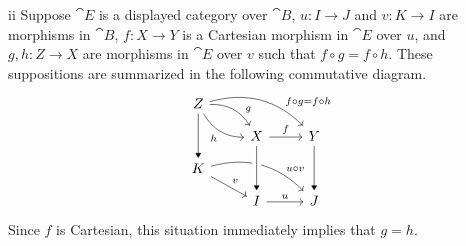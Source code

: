 \begin{partsolution}{ii}
Suppose \(\cat{E}\) is a displayed category over \(\cat{B}\), \(u : I \to J\) and \(v : K \to I\) are morphisms in \(\cat{B}\), \(f : X \to Y\) is a Cartesian morphism in \(\cat{E}\) over \(u\), and \(g, h : Z \to X\) are morphisms in \(\cat{E}\) over \(v\) such that \(f \circ g = f \circ h\).
These suppositions are summarized in the following commutative diagram.
\begin{equation*}
\begin{tikzcd}[row sep=small]
Z \arrow[rd, bend left, near end, "g"] \arrow[rd, bend right, "h"{below left}] \arrow[dd, -Triangle] \arrow[rrd, bend left, near end, "f \circ g = f \circ h"] \\
& X \arrow[dd, -Triangle] \arrow[r, "f"] & Y \arrow[dd, -Triangle] \\
K \arrow[rd, "v"] \arrow[rrd, bend left, near end, "u \circ v"] \\
& I \arrow[r, "u"] & J
\arrow[from=uul, to=l, -Triangle, crossing over]
\end{tikzcd}
\end{equation*}
Since \(f\) is Cartesian, this situation immediately implies that \(g = h\).
\end{partsolution}